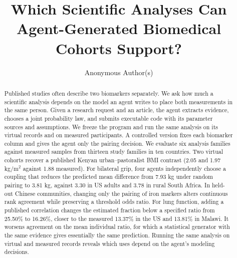 \documentclass[sigconf,anonymous,review]{acmart}
\begin{document}
\title[Which Analyses Can Agent-Generated Cohorts Support?]{Which Scientific Analyses Can Agent-Gener\-ated Biomedical Cohorts Support?}
\author{Anonymous Author(s)}

\begin{abstract}
Published studies often describe two biomarkers separately. We ask how much a scientific analysis depends on the model an agent writes to place both measurements in the same person. Given a research request and an article, the agent extracts evidence, chooses a joint probability law, and submits executable code with its parameter sources and assumptions. We freeze the program and run the same analysis on its virtual records and on measured participants. A controlled version fixes each biomarker column and gives the agent only the pairing decision. We evaluate six analysis families against measured samples from thirteen study families in ten countries. Two virtual cohorts recover a published Kenyan urban--pastoralist BMI contrast (2.05 and 1.97 kg/m$^2$ against 1.88 measured). For bilateral grip, four agents independently choose a coupling that reduces the predicted mean difference from 7.93 kg under random pairing to 3.81 kg, against 3.30 in US adults and 3.78 in rural South Africa. In held-out Chinese communities, changing only the pairing of iron markers alters continuous rank agreement while preserving a threshold odds ratio. For lung function, adding a published correlation changes the estimated fraction below a specified ratio from 25.50\% to 16.26\%, closer to the measured 13.37\% in the US and 13.81\% in Malawi. It worsens agreement on the mean individual ratio, for which a statistical generator with the same evidence gives essentially the same prediction. Running the same analysis on virtual and measured records reveals which uses depend on the agent's modeling decisions.
\end{abstract}

\maketitle
\end{document}
